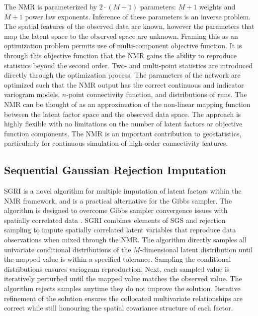 The \gls{NMR} is parameterized by $2 \cdot (M+1)$ parameters: $M+1$ weights and $M+1$ power law exponents. Inference of these parameters is an inverse problem. The spatial features of the observed data are known, however the parameters that map the latent space to the observed space are unknown. Framing this as an optimization problem permits use of multi-component objective function. It is through this objective function that the \gls{NMR} gains the ability to reproduce statistics beyond the second order. Two- and multi-point statistics are introduced directly through the optimization process. The parameters of the network are optimized such that the \gls{NMR} output has the correct continuous and indicator variogram models, $n$-point connectivity function, and distributions of runs. The \gls{NMR} can be thought of as an approximation of the non-linear mapping function between the latent factor space and the observed data space. The approach is highly flexible with no limitations on the number of latent factors or objective function components. The \gls{NMR} is an important contribution to geostatistics, particularly for continuous simulation of high-order connectivity features.

\subsection{Sequential Gaussian Rejection Imputation}
\label{subsec:07sgri}

\Gls{SGRI} is a novel algorithm for multiple imputation of latent factors within the \gls{NMR} framework, and is a practical alternative for the Gibbs sampler. The algorithm is designed to overcome Gibbs sampler convergence issues with spatially correlated data \citep{silva2018enhanced}. \Gls{SGRI} combines elements of \gls{SGS} and rejection sampling to impute spatially correlated latent variables that reproduce data observations when mixed through the \gls{NMR}. The algorithm directly samples all univariate conditional distributions of the $M$-dimensional latent distribution until the mapped value is within a specified tolerance. Sampling the conditional distributions ensures variogram reproduction. Next, each sampled value is iteratively perturbed until the mapped value matches the observed value. The algorithm rejects samples anytime they do not improve the solution. Iterative refinement of the solution ensures the collocated multivariate relationships are correct while still honouring the spatial covariance structure of each factor.

